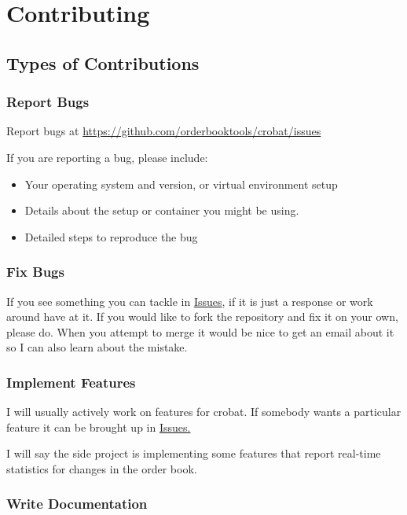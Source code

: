 \section{Contributing}
\subsection{Types of Contributions}
\subsubsection{Report Bugs}
Report bugs at \href{https://github.com/orderbooktools/crobat/issues}{https://github.com/orderbooktools/crobat/issues}

If you are reporting a bug, please include:
\begin{itemize}
	\item Your operating system and version, or virtual environment setup
	\item Details about the setup or container you might be using.
	\item Detailed steps to reproduce the bug
\end{itemize}

\subsubsection{Fix Bugs}

If you see something you can tackle in \href{https://github.com/orderbooktools/crobat/issues}{Issues}, if it is just a response or work around have at it. If you would like to fork the repository and fix it on your own, please do. When you attempt to merge it would be nice to get an email about it so I can also learn about the mistake. 

\subsubsection{Implement Features}

I will usually actively work on features for crobat. If somebody wants a particular feature it can be brought up in \href{https://github.com/orderbooktools/crobat/issues}{Issues.}
\smallskip

\noindent I will say the side project is implementing some features that report real-time statistics for changes in the order book.

\subsubsection{Write Documentation}

